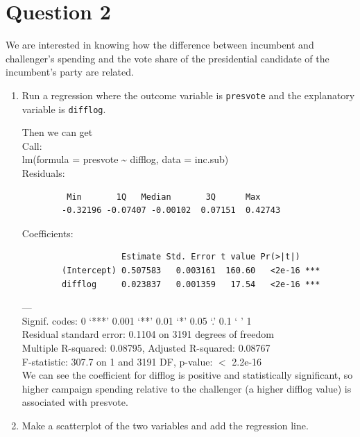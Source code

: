 \documentclass[12pt,letterpaper]{article}
\begin{document}
\section*{Question 2}
\noindent We are interested in knowing how the difference between incumbent and challenger's spending and the vote share of the presidential candidate of the incumbent's party are related.	\vspace{.25cm}
	\begin{enumerate}
		\item Run a regression where the outcome variable is \texttt{presvote} and the explanatory variable is \texttt{difflog}.
		
			 
			
			Then we can get\\
			
		Call:\\
		lm(formula = presvote \~{} difflog, data = inc.sub)\\
		
		
		Residuals:\\
			\begin{verbatim}
		 Min       1Q   Median       3Q      Max 
		-0.32196 -0.07407 -0.00102  0.07151  0.42743 
		\end{verbatim}
		Coefficients:\\
			\begin{verbatim}
	            	Estimate Std. Error t value Pr(>|t|)    
		(Intercept) 0.507583   0.003161  160.60   <2e-16 ***
		difflog     0.023837   0.001359   17.54   <2e-16 ***
		\end{verbatim}
		---\\
		Signif. codes:  0 ‘***’ 0.001 ‘**’ 0.01 ‘*’ 0.05 ‘.’ 0.1 ‘ ’ 1\\
		
		Residual standard error: 0.1104 on 3191 degrees of freedom\\
		Multiple R-squared:  0.08795,	Adjusted R-squared:  0.08767 \\
		F-statistic: 307.7 on 1 and 3191 DF,  p-value: $<$ 2.2e-16\\
		
		We can see the coefficient for difflog is positive and statistically significant, so higher campaign spending relative to the challenger (a higher difflog value) is associated with presvote.
			\vspace{5cm}
		\item Make a scatterplot of the two variables and add the regression line. 
			 
			\begin{figure}[H]\centering
			

\end{figure}
\end{enumerate}
\end{document}
